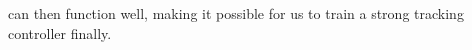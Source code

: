 can then function well, making it possible for us to train a strong tracking controller finally. 







